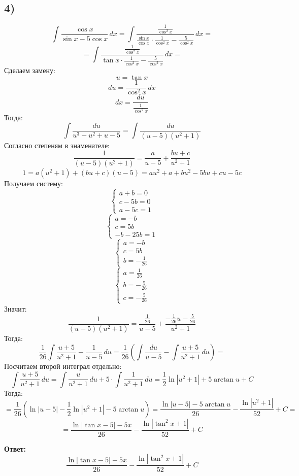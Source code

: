 \documentclass[a4paper,12pt]{article}
\begin{document}
\subsection*{4)}
\[
\int \frac{\cos x}{\sin x - 5 \cos x} \, dx =  \int \frac{\frac{1}{\cos^2 x}}{\frac{\sin x}{ \cos x} \cdot \frac{1}{\cos^2 x} - \frac{5}{\cos^2x}}\, dx = 
\]
\[
=
\int \frac{\frac{1}{\cos^2 x}}{\tan x \cdot \frac{1}{\cos ^2 x} - \frac{5}{\cos^2x}} \, dx = 
\]
Сделаем замену:
\[
u = \tan x 
\]
\[
du = \frac{1}{\cos^2x} \, dx
\]
\[
dx = \frac{du}{\frac{1}{\cos^2x}}
\]
Тогда:
\[
\int \frac{du}{u^3 -u^2+ u- 5} = \int \frac{du}{(u-5)(u^2 +1)}
\]
Согласно степеням в знаменателе:
\[
\frac{1}{(u-5)(u^2+1)} = \frac{a}{u-5} + \frac{bu + c}{u^2 + 1}
\]
\[
1 = a(u^2+1) + (bu + c)(u-5) = au^2 + a + bu^2 -5bu +cu -5c
\]
Получаем систему:
\[
\begin{cases}
a + b= 0 \\ c - 5b = 0 \\ a -5c = 1
\end{cases}
\]
\[
\begin{cases}
a= -b \\ c = 5b \\ -b -25b = 1
\end{cases}
\]
\[
\begin{cases}
a= -b \\ c = 5b \\ b = -\frac{1}{26}
\end{cases}
\]
\[
\begin{cases}
a= \frac{1}{26} \\ b= -\frac{5}{26} \\ c = -\frac{5}{26}
\end{cases}
\]
Значит:
\[
\frac{1}{(u-5)(u^2+1)} = \frac{\frac{1}{26}}{u-5} + \frac{-\frac{1}{26}u - \frac{5}{26}}{u^2 + 1}
\]
Тогда:
\[
\frac{1}{26} \int \frac{u + 5}{u^2 + 1} - \frac{1}{u - 5} \, du = \frac{1}{26} \left( \int \frac{du}{u-5} - \int \frac{u+5}{u^2+1} \, du \right) = 
\]
Посчитаем второй интеграл отдельно:
\[
\int \frac{u+5}{u^2+1} \, du = \int \frac{u}{u^2 + 1} \, du + 5 \cdot  \int \frac{1}{u^2 + 1} \, du = \frac{1}{2} \ln |u^2 + 1| + 5 \arctan u   + C
\]
Тогда:
\[
= \frac{1}{26} \left(\ln |u -5| - \frac{1}{2} \ln |u^2 + 1| - 5 \arctan u \right) = \frac{\ln |u - 5| - 5 \arctan u}{26} - \frac{\ln |u^2 + 1|}{52} + C = 
\]
\[
=
\frac{\ln |\tan x - 5| - 5x}{26} - \frac{\ln |\tan^2 x + 1|}{52} + C 
\]
\begin{center}
\textbf{Ответ: } 
\[
\frac{\ln |\tan x - 5| - 5x}{26} - \frac{\ln |\tan^2 x + 1|}{52} + C 
\]
\end{center}
\end{document}
